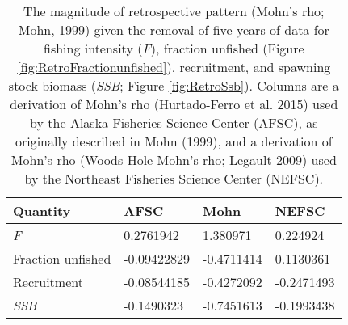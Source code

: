 
\begin{longtable}[t]{llll}
\caption{\label{tab:RetroMohnsrho}The magnitude of retrospective pattern (Mohn's rho; Mohn, 1999) given the removal of five years of data for fishing intensity (\emph{F}), fraction unfished (Figure \ref{fig:RetroFractionunfished}),  recruitment, and spawning stock biomass (\emph{SSB}; Figure \ref{fig:RetroSsb}). Columns are a derivation of Mohn's rho (Hurtado-Ferro et al. 2015) used by the Alaska Fisheries Science Center (AFSC), as originally described in Mohn (1999), and a derivation of Mohn's rho (Woods Hole Mohn's rho; Legault 2009) used by the Northeast Fisheries Science Center (NEFSC).}\\
\toprule
Quantity & AFSC & Mohn & NEFSC\\
\midrule
\emph{F} & 0.2761942 & 1.380971 & 0.224924\\
Fraction unfished & -0.09422829 & -0.4711414 & 0.1130361\\
Recruitment & -0.08544185 & -0.4272092 & -0.2471493\\
\emph{SSB} & -0.1490323 & -0.7451613 & -0.1993438\\
\bottomrule
\end{longtable}
